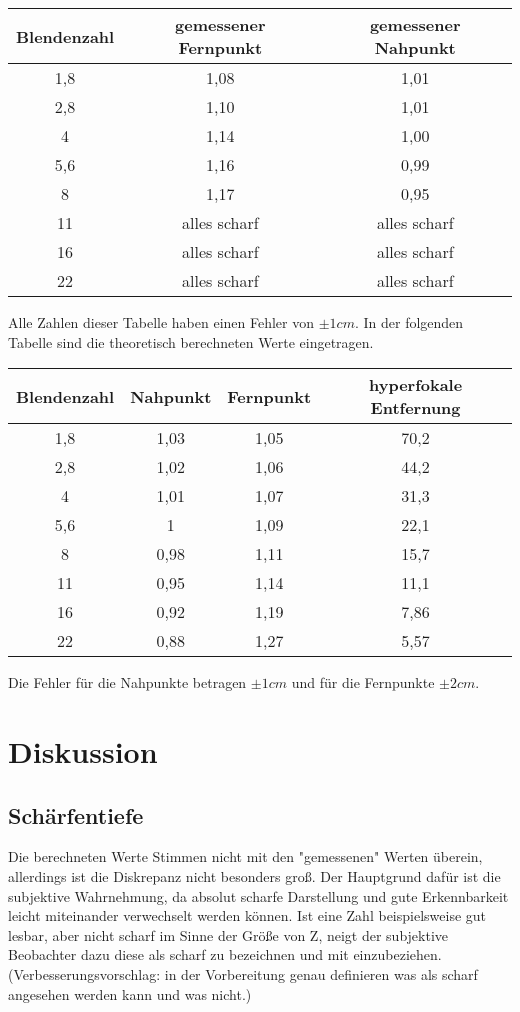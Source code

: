 \begin{tabular}{|c|c|c|}
\hline 
Blendenzahl & gemessener Fernpunkt & gemessener Nahpunkt \\ 
\hline 
1,8 & 1,08 & 1,01 \\ 
\hline 
2,8 & 1,10 & 1,01 \\ 
\hline 
4 & 1,14 & 1,00 \\ 
\hline 
5,6 & 1,16 & 0,99 \\ 
\hline 
8 & 1,17 & 0,95 \\ 
\hline 
11 & alles scharf & alles scharf \\ 
\hline 
16 & alles scharf & alles scharf \\ 
\hline 
22 & alles scharf & alles scharf \\ 
\hline 
\end{tabular} 


Alle Zahlen dieser Tabelle haben einen Fehler von $ \pm1cm $.
In der folgenden Tabelle sind die theoretisch berechneten Werte eingetragen.



\begin{tabular}{|c|c|c|c|}
\hline 
Blendenzahl & Nahpunkt & Fernpunkt & hyperfokale Entfernung \\ 
\hline 
1,8 & 1,03 & 1,05 & 70,2 \\ 
\hline 
2,8 & 1,02 & 1,06 & 44,2 \\ 
\hline 
4 & 1,01 & 1,07 & 31,3 \\ 
\hline 
5,6 & 1 & 1,09 & 22,1 \\ 
\hline 
8 & 0,98 & 1,11 & 15,7 \\ 
\hline 
11 & 0,95 & 1,14 & 11,1 \\ 
\hline 
16 & 0,92 & 1,19 & 7,86 \\ 
\hline 
22 & 0,88 & 1,27 & 5,57 \\ 
\hline 
\end{tabular} 


Die Fehler für die Nahpunkte betragen $ \pm1cm $ und für die Fernpunkte $ \pm2 cm $.

\section{Diskussion}
\subsection{Schärfentiefe}
Die berechneten Werte Stimmen nicht mit den "gemessenen" Werten überein, allerdings ist die Diskrepanz nicht besonders groß. Der Hauptgrund dafür ist die subjektive Wahrnehmung, da absolut scharfe Darstellung und gute Erkennbarkeit leicht miteinander verwechselt werden können. Ist eine Zahl beispielsweise gut lesbar, aber nicht scharf im Sinne der Größe von Z, neigt der subjektive Beobachter dazu diese als scharf zu bezeichnen und mit einzubeziehen. (Verbesserungsvorschlag: in der Vorbereitung genau definieren was als scharf angesehen werden kann und was nicht.)
